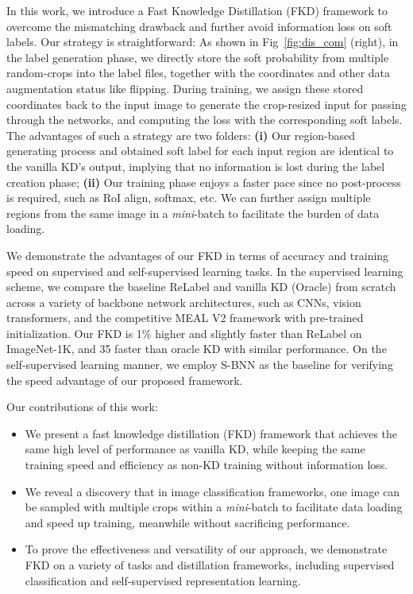 \documentclass[10pt,twocolumn,letterpaper]{article}
\begin{document}
In this work, we introduce a Fast Knowledge Distillation (FKD) framework to overcome the mismatching drawback and further avoid information loss on soft labels. Our strategy is straightforward: As shown in Fig~\ref{fig:dis_com} (right), in the label generation phase, we directly store the soft probability from multiple random-crops into the label files, together with the coordinates and other data augmentation status like flipping. During training, we assign these stored coordinates back to the input image to generate the crop-resized input for passing through the networks, and computing the loss with the corresponding soft labels. The advantages of such a strategy are two folders: {\bf(i)} Our region-based generating process and obtained soft label for each input region are identical to the vanilla KD's output, implying that no information is lost during the label creation phase; {\bf(ii)} Our training phase enjoys a faster pace since no post-process is required, such as RoI align, softmax, etc. We can further assign multiple regions from the same image in a {\em mini}-batch to facilitate the burden of data loading.

We demonstrate the advantages of our FKD in terms of accuracy and training speed on supervised and self-supervised learning tasks. In the supervised learning scheme, we compare the baseline ReLabel and vanilla KD (Oracle) from scratch across a variety of backbone network architectures, such as CNNs, vision transformers, and the competitive MEAL V2 framework with pre-trained initialization. Our FKD is 1\% higher and slightly faster than ReLabel on ImageNet-1K, and 35 faster than oracle KD with similar performance. On the self-supervised learning manner, we employ S-BNN as the baseline for verifying the speed advantage of our proposed framework.


Our contributions of this work:
\vspace{-0.08in}
\begin{itemize}[leftmargin=0.14in]
	\addtolength{\itemsep}{-0.08in}
	\item We present a fast knowledge distillation (FKD) framework that achieves the same high level of performance as vanilla KD, while keeping the same training speed and efficiency as non-KD training without information loss.
	\item We reveal a discovery that in image classification frameworks, one image can be sampled with multiple crops within a {\em mini}-batch to facilitate data loading and speed up training, meanwhile without sacrificing performance.
	\item To prove the effectiveness and versatility of our approach, we demonstrate FKD on a variety of tasks and distillation frameworks, including supervised classification and self-supervised representation learning.
\end{itemize}
\end{document}
